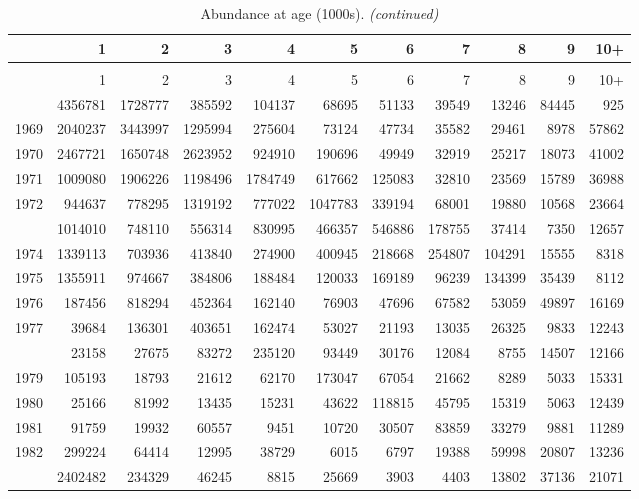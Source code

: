 \documentclass[
]{article}
\begin{document}
\begin{longtable}[t]{lrrrrrrrrrr}
\caption{\label{tab:NAA-table}Abundance at age (1000s).}\\
\toprule
  & 1 & 2 & 3 & 4 & 5 & 6 & 7 & 8 & 9 & 10+\\
\midrule
\endfirsthead
\caption[]{Abundance at age (1000s). \textit{(continued)}}\\
\toprule
  & 1 & 2 & 3 & 4 & 5 & 6 & 7 & 8 & 9 & 10+\\
\midrule
\endhead

\endfoot
\bottomrule
\endlastfoot
1968 & 4356781 & 1728777 & 385592 & 104137 & 68695 & 51133 & 39549 & 13246 & 84445 & 925\\
1969 & 2040237 & 3443997 & 1295994 & 275604 & 73124 & 47734 & 35582 & 29461 & 8978 & 57862\\
1970 & 2467721 & 1650748 & 2623952 & 924910 & 190696 & 49949 & 32919 & 25217 & 18073 & 41002\\
1971 & 1009080 & 1906226 & 1198496 & 1784749 & 617662 & 125083 & 32810 & 23569 & 15789 & 36988\\
1972 & 944637 & 778295 & 1319192 & 777022 & 1047783 & 339194 & 68001 & 19880 & 10568 & 23664\\
\addlinespace
1973 & 1014010 & 748110 & 556314 & 830995 & 466357 & 546886 & 178755 & 37414 & 7350 & 12657\\
1974 & 1339113 & 703936 & 413840 & 274900 & 400945 & 218668 & 254807 & 104291 & 15555 & 8318\\
1975 & 1355911 & 974667 & 384806 & 188484 & 120033 & 169189 & 96239 & 134399 & 35439 & 8112\\
1976 & 187456 & 818294 & 452364 & 162140 & 76903 & 47696 & 67582 & 53059 & 49897 & 16169\\
1977 & 39684 & 136301 & 403651 & 162474 & 53027 & 21193 & 13035 & 26325 & 9833 & 12243\\
\addlinespace
1978 & 23158 & 27675 & 83272 & 235120 & 93449 & 30176 & 12084 & 8755 & 14507 & 12166\\
1979 & 105193 & 18793 & 21612 & 62170 & 173047 & 67054 & 21662 & 8289 & 5033 & 15331\\
1980 & 25166 & 81992 & 13435 & 15231 & 43622 & 118815 & 45795 & 15319 & 5063 & 12439\\
1981 & 91759 & 19932 & 60557 & 9451 & 10720 & 30507 & 83859 & 33279 & 9881 & 11289\\
1982 & 299224 & 64414 & 12995 & 38729 & 6015 & 6797 & 19388 & 59998 & 20807 & 13236\\
\addlinespace
1983 & 2402482 & 234329 & 46245 & 8815 & 25669 & 3903 & 4403 & 13802 & 37136 & 21071\\

\end{longtable}
\end{document}
